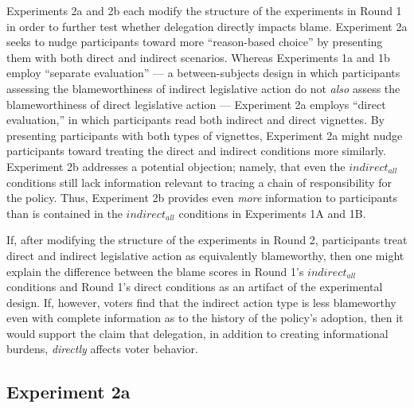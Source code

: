 \documentclass{article}
\begin{document}
Experiments 2a and 2b each modify the structure of the experiments in Round 1 in order to further test whether delegation directly impacts blame. Experiment 2a seeks to nudge participants toward more ``reason-based choice'' by presenting them with both direct and indirect scenarios. \citep{Hsee2010} Whereas Experiments 1a and 1b employ ``separate evaluation'' --- a between-subjects design in which participants assessing the blameworthiness of indirect legislative action do not \emph{also} assess the blameworthiness of direct legislative action --- Experiment 2a employs ``direct evaluation,'' in which participants read both indirect and direct vignettes. By presenting participants with both types of vignettes, Experiment 2a might nudge participants toward treating the direct and indirect conditions more similarly. Experiment 2b addresses a potential objection; namely, that even the $indirect_{all}$ conditions still lack information relevant to tracing a chain of responsibility for the policy. Thus, Experiment 2b provides even \emph{more} information to participants than is contained in the $indirect_{all}$ conditions in Experiments 1A and 1B. 

If, after modifying the structure of the experiments in Round 2, participants treat direct and indirect legislative action as equivalently blameworthy, then one might explain the difference between the blame scores in Round 1's $indirect_{all}$ conditions and Round 1's direct conditions as an artifact of the experimental design. If, however, voters find that the indirect action type is less blameworthy even with complete information as to the history of the policy's adoption, then it would support the claim that delegation, in addition to creating informational burdens, \emph{directly} affects voter behavior. 

\subsection{Experiment 2a}
\end{document}

